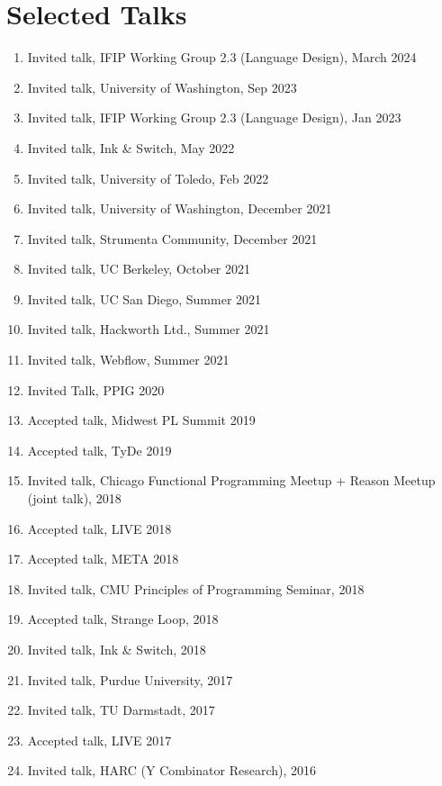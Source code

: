 \documentclass[10pt,letterpaper]{article}
\renewenvironment{itemize}{
  \begin{list}{}{
    \setlength{\leftmargin}{1.25em}
    \setlength{\itemsep}{0.25em}
    \setlength{\parskip}{0pt}
    \setlength{\parsep}{0.2em}
  }
}{
  \end{list}
}
\begin{document}
\section*{Selected Talks}
\begin{enumerate}
  \item Invited talk, IFIP Working Group 2.3 (Language Design), March 2024
  \item Invited talk, University of Washington, Sep 2023
  \item Invited talk, IFIP Working Group 2.3 (Language Design), Jan 2023
  \item Invited talk, Ink \& Switch, May 2022
  \item Invited talk, University of Toledo, Feb 2022
  \item Invited talk, University of Washington, December 2021
  \item Invited talk, Strumenta Community, December 2021
  \item Invited talk, UC Berkeley, October 2021
  \item Invited talk, UC San Diego, Summer 2021
  \item Invited talk, Hackworth Ltd., Summer 2021
  \item Invited talk, Webflow, Summer 2021
  \item Invited Talk, PPIG 2020
  \item Accepted talk, Midwest PL Summit 2019
  \item Accepted talk, TyDe 2019
  \item Invited talk, Chicago Functional Programming Meetup + Reason Meetup (joint talk), 2018
  \item Accepted talk, LIVE 2018
  \item Accepted talk, META 2018
  \item Invited talk, CMU Principles of Programming Seminar, 2018
  \item Accepted talk, Strange Loop, 2018
  \item Invited talk, Ink \& Switch, 2018
  \item Invited talk, Purdue University, 2017
  \item Invited talk, TU Darmstadt, 2017
  \item Accepted talk, LIVE 2017
  \item Invited talk, HARC (Y Combinator Research), 2016

\end{enumerate}
\end{document}
